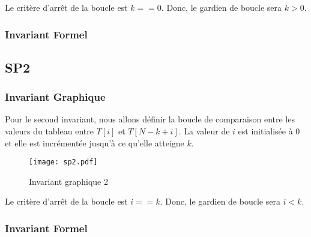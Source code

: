 Le critère d'arrêt de la boucle est $k ==0$. Donc, le gardien de boucle sera
$k > 0$.

\subsubsection{Invariant Formel}

\begin{center}
\end{center}

\subsection{SP2}
\subsubsection{Invariant Graphique}
Pour le second invariant, nous allons définir la boucle de comparaison entre les
valeurs du tableau entre $T[i]$ et $T[N-k+i]$. La valeur de $i$ est initialisée 
à 0 et elle est incrémentée jusqu'à ce qu'elle atteigne $k$.

\begin{figure}[h]
   \centering
   \texttt{[image: sp2.pdf]}
   \caption{Invariant graphique 2}
   \label{fig:invariant2}
\end{figure}

Le critère d'arrêt de la boucle est $i == k$. Donc, le gardien de boucle sera
$i < k$.
\subsubsection{Invariant Formel}

\begin{center}
\end{center}